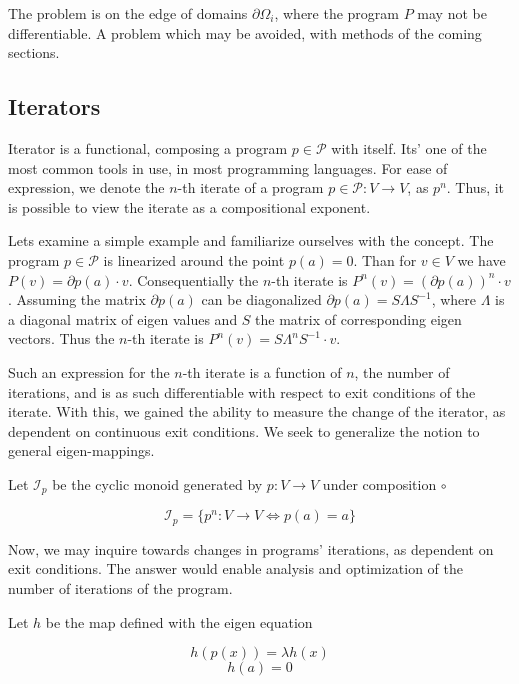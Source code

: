 \documentclass{article}
\newcommand{\dP}{\mathcal{P}}
\newcommand{\D}{\partial}
\begin{document}
 The problem is on the edge of domains $\partial\Omega_i$, where the program $P$ may not be differentiable. A problem which may be avoided, with methods of the coming sections.
 
  \subsection{Iterators}
  
  Iterator is a functional, composing a program $p\in\dP$ with itself. Its' one of the most common tools in use, in most programming languages. For ease of expression, we denote the $n$-th iterate of a program $p\in\dP:V\to V$, as $p^n$. Thus, it is possible to view the iterate as a compositional exponent.
  
  Lets examine a simple example and familiarize ourselves with the concept. The program $p\in\dP$ is linearized around the point $p(a)=0$. Than for $v\in V$ we have $P(v)=\D p(a)\cdot v$. Consequentially the $n$-th iterate is $P^n(v)=(\D p(a))^n\cdot v$. Assuming the matrix $\D p(a)$ can be diagonalized $\D p(a)=S\Lambda S^{-1}$, where $\Lambda$ is a diagonal matrix of eigen values and $S$ the matrix of corresponding eigen vectors. Thus the $n$-th iterate is $P^n(v)=S\Lambda^nS^{-1}\cdot v$.
  
  Such an expression for the $n$-th iterate is a function of $n$, the number of iterations, and is as such differentiable with respect to exit conditions of the iterate. With this, we gained the ability to measure the change of the iterator, as dependent on continuous exit conditions. We seek to generalize the notion to general eigen-mappings.
  
  Let $\mathcal{I}_p$ be the cyclic monoid generated by $p:V\to V$ under composition $\circ$
  
  \begin{equation}
  \mathcal{I}_p=\{p^n:V\to V\iff p(a)=a\}
  \end{equation}
  
  Now, we may inquire towards changes in programs' iterations, as dependent on exit conditions. The answer would enable analysis and optimization of the number of iterations of the program. 
  
  Let $h$ be the map defined with the eigen equation
    
  \begin{equation}\label{eq:kh}
  h(p(x))=\lambda h(x)
  \end{equation}
   \begin{equation}
   h(a)=0
   \end{equation}
  
\end{document}
